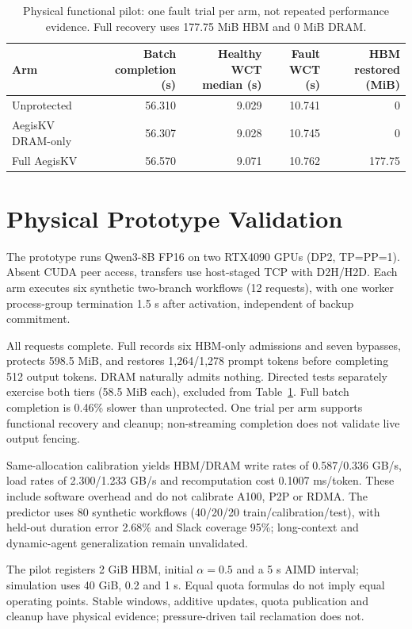 \begin{table}[t]
\centering
\caption{Physical functional pilot: one fault trial per arm, not repeated
performance evidence. Full recovery uses 177.75 MiB HBM and 0 MiB DRAM.}
\label{tab:physical}
\begin{tabular}{@{}lrrrr@{}}
\toprule
Arm & Batch completion (s) & Healthy WCT median (s) & Fault WCT (s) & HBM restored (MiB) \\
\midrule
Unprotected & 56.310 & 9.029 & 10.741 & 0 \\
AegisKV DRAM-only & 56.307 & 9.028 & 10.745 & 0 \\
Full AegisKV & 56.570 & 9.071 & 10.762 & 177.75 \\
\bottomrule
\end{tabular}
\end{table}

\section{Physical Prototype Validation}
\label{sec:physical}
The prototype runs Qwen3-8B FP16 on two RTX4090 GPUs (DP2, TP=PP=1).
Absent CUDA peer access, transfers use host-staged TCP with D2H/H2D.
Each arm executes six synthetic two-branch workflows (12 requests), with
one worker process-group termination 1.5 s after activation, independent
of backup commitment.

All requests complete. Full records six HBM-only admissions and seven
bypasses, protects 598.5 MiB, and restores 1,264/1,278 prompt tokens before
completing 512 output tokens. DRAM naturally admits nothing. Directed
tests separately exercise both tiers (58.5 MiB each), excluded from
Table~\ref{tab:physical}. Full batch completion is 0.46\% slower than
unprotected. One trial per arm supports functional recovery and cleanup;
non-streaming completion does not validate live output fencing.

Same-allocation calibration yields HBM/DRAM write rates of 0.587/0.336 GB/s,
load rates of 2.300/1.233 GB/s and recomputation cost 0.1007 ms/token.
These include software overhead and do not calibrate A100, P2P or RDMA.
The predictor uses 80 synthetic workflows (40/20/20 train/calibration/test),
with held-out duration error 2.68\% and Slack coverage 95\%; long-context
and dynamic-agent generalization remain unvalidated.

The pilot registers 2 GiB HBM, initial $\alpha=0.5$ and a 5 s AIMD interval;
simulation uses 40 GiB, 0.2 and 1 s. Equal quota formulas do not imply equal
operating points. Stable windows, additive updates, quota publication and
cleanup have physical evidence; pressure-driven tail reclamation does not.
